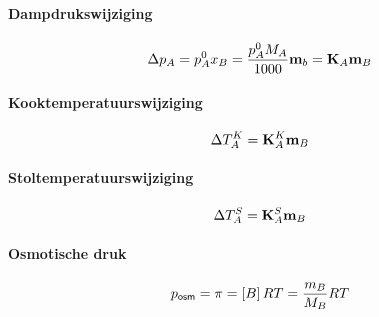 \paragraph{Dampdrukswijziging}
\[
  \Delta p_A = p_A^0x_B = \frac{p_A^0 M_A}{1000} \mathbf{m}_b = \mathbf{K}_A \mathbf{m}_B
\]

\paragraph{Kooktemperatuurswijziging}
\[
  \Delta T^{K}_A = \mathbf{K}^K_A \mathbf{m}_B
\]

\paragraph{Stoltemperatuurswijziging}
\[
  \Delta T^{S}_A = \mathbf{K}^S_A \mathbf{m}_B
\]

\paragraph{Osmotische druk}
\[
  p_{\textsf{osm}} = \pi = \left[ B \right]RT = \frac{m_B}{M_B}RT 
\]